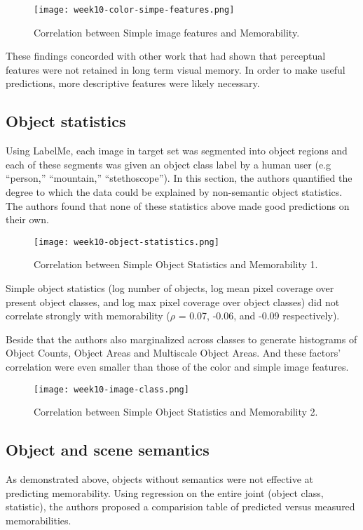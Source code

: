 \begin{figure}[!ht]
\centering
\texttt{[image: week10-color-simpe-features.png]}
\caption{Correlation between Simple image features and Memorability.}
\end{figure}

These findings concorded with other work that had shown that perceptual features were not retained in long term visual memory\cite{simplefeatures}. In order to make useful predictions, more descriptive features were likely necessary.

\subsection{Object statistics}
Using LabelMe\cite{labelme}, each image in target set was segmented into object regions and each of these segments was given an object class label by a human user (e.g “person,” “mountain,” “stethoscope”). In this section, the authors quantified the degree to which the data could be explained by non-semantic object statistics. The authors found that none of these statistics above made good predictions on their own. 

\begin{figure}[!ht]
\centering
\texttt{[image: week10-object-statistics.png]}
\caption{Correlation between Simple Object Statistics and Memorability 1.}
\end{figure}
    
Simple object statistics (log number of objects, log mean pixel coverage over present object classes, and log max pixel coverage over object classes) did not correlate strongly with memorability ($\rho$ = 0.07, -0.06, and -0.09 respectively).

Beside that the authors also marginalized across classes to generate histograms of Object Counts, Object Areas and Multiscale Object Areas. And these factors' correlation were even smaller than those of the color and simple image features.

\begin{figure}[!ht]
\centering
\texttt{[image: week10-image-class.png]}
\caption{Correlation between Simple Object Statistics and Memorability 2.}
\end{figure}

\subsection{Object and scene semantics}
As demonstrated above, objects without semantics were not effective at predicting memorability. Using regression on the entire joint (object class, statistic), the authors proposed a comparision table of predicted versus measured memorabilities.


